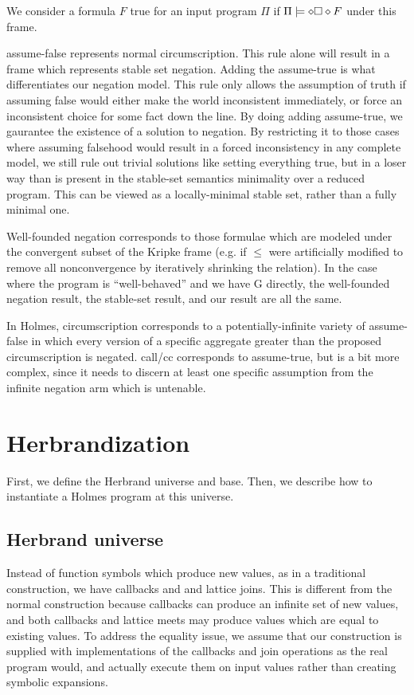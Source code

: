 We consider a formula $F$ true for an input program $\Pi$ if $\Pi \models \diamond \square \diamond F$ under this frame.

assume-false represents normal circumscription.
This rule alone will result in a frame which represents stable set negation.
Adding the assume-true is what differentiates our negation model.
This rule only allows the assumption of truth if assuming false would either make the world inconsistent immediately, or force an inconsistent choice for some fact down the line.
By doing adding assume-true, we gaurantee the existence of a solution to negation.
By restricting it to those cases where assuming falsehood would result in a forced inconsistency in any complete model, we still rule out trivial solutions like setting everything true, but in a loser way than is present in the stable-set semantics minimality over a reduced program.
This can be viewed as a locally-minimal stable set, rather than a fully minimal one.

Well-founded negation corresponds to those formulae which are modeled under the convergent subset of the Kripke frame (e.g. if $\leq$ were artificially modified to remove all nonconvergence by iteratively shrinking the relation).
In the case where the program is ``well-behaved'' and we have G directly, the well-founded negation result, the stable-set result, and our result are all the same. 


In Holmes, circumscription corresponds to a potentially-infinite variety of assume-false in which every version of a specific aggregate greater than the proposed circumscription is negated.
call/cc corresponds to assume-true, but is a bit more complex, since it needs to discern at least one specific assumption from the infinite negation arm which is untenable.

\section{Herbrandization}
\label{formal:sec:herbrand}
First, we define the Herbrand universe and base.
Then, we describe how to instantiate a Holmes program at this universe.

\subsection{Herbrand universe}
Instead of function symbols which produce new values, as in a traditional construction, we have callbacks and and lattice joins.
This is different from the normal construction because callbacks can produce an infinite set of new values, and both callbacks and lattice meets may produce values which are equal to existing values.
To address the equality issue, we assume that our construction is supplied with implementations of the callbacks and join operations as the real program would, and actually execute them on input values rather than creating symbolic expansions.

